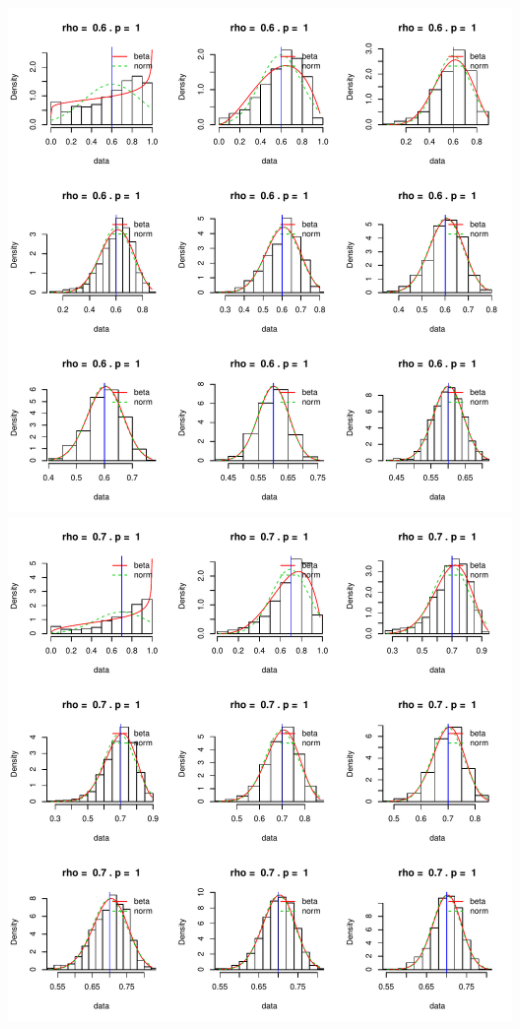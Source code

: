 \documentclass[]{article}
\begin{document}
\includegraphics{2016_w09_files/figure-latex/unnamed-chunk-13-7.pdf}
\includegraphics{2016_w09_files/figure-latex/unnamed-chunk-13-8.pdf}
\end{document}
